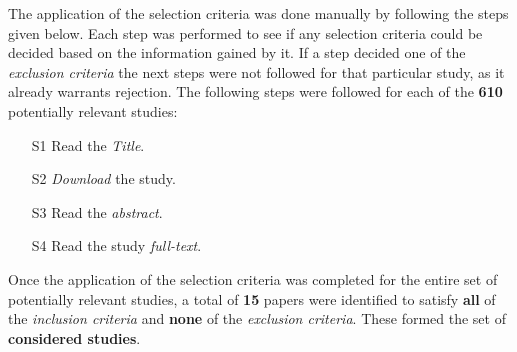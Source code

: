 The application of the selection criteria was done manually by following the steps given below. 
Each step was performed to see if any selection criteria could be decided based on the information gained by it. 
If a step decided one of the \textit{exclusion criteria} the next steps were not followed for that particular study, 
as it already warrants rejection. 
The following steps were followed for each of the \textbf{610} potentially relevant studies:
\begin{itemize}
	\item[S1] Read the \textit{Title}.
	\item[S2] \textit{Download} the study.
	\item[S3] Read the \textit{abstract}.
	\item[S4] Read the study \textit{full-text}.
\end{itemize}

Once the application of the selection criteria was completed for the entire set of potentially relevant studies,
a total of \textbf{15} papers were identified to satisfy \textbf{all} of the \textit{inclusion criteria} and
\textbf{none} of the \textit{exclusion criteria}. These formed the set of \textbf{considered studies}.

\vspace{5mm}

